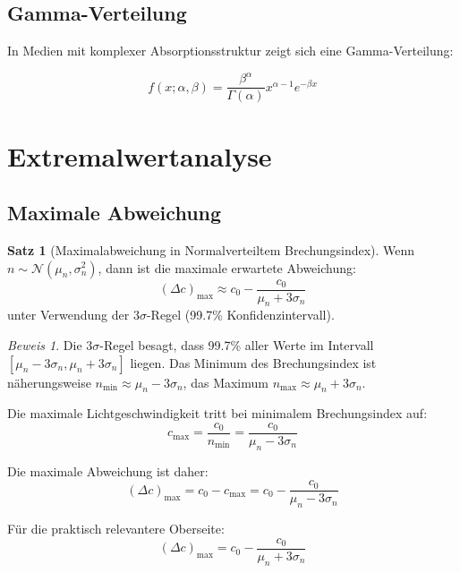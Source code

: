 \documentclass[a4paper,12pt]{article}
\theoremstyle{definition}
\newtheorem{satz}{Satz}[section]
\theoremstyle{remark}
\newtheorem*{beweis}{Beweis}
\newcommand{\cLight}{c}
\newcommand{\refIndex}{n}
\newcommand{\deviation}{\Delta}
\begin{document}
\subsection{Gamma-Verteilung}

In Medien mit komplexer Absorptionsstruktur zeigt sich eine Gamma-Verteilung:

\begin{equation}
    f(x; \alpha, \beta) = \frac{\beta^\alpha}{\Gamma(\alpha)} x^{\alpha-1} e^{-\beta x}
\end{equation}

\section{Extremalwertanalyse}

\subsection{Maximale Abweichung}

\begin{satz}[Maximalabweichung in Normalverteiltem Brechungsindex]
Wenn $\refIndex \sim \mathcal{N}(\mu_n, \sigma_n^2)$, dann ist die maximale erwartete Abweichung:
\begin{equation}
    (\deviation \cLight)_{\max} \approx \cLight_0 - \frac{\cLight_0}{\mu_n + 3\sigma_n}
\end{equation}
unter Verwendung der $3\sigma$-Regel (99.7\% Konfidenzintervall).
\end{satz}

\begin{beweis}
Die $3\sigma$-Regel besagt, dass 99.7\% aller Werte im Intervall $[\mu_n - 3\sigma_n, \mu_n + 3\sigma_n]$ liegen. Das Minimum des Brechungsindex ist näherungsweise $n_{\min} \approx \mu_n - 3\sigma_n$, das Maximum $n_{\max} \approx \mu_n + 3\sigma_n$.

Die maximale Lichtgeschwindigkeit tritt bei minimalem Brechungsindex auf:
\begin{equation}
    \cLight_{\max} = \frac{\cLight_0}{n_{\min}} = \frac{\cLight_0}{\mu_n - 3\sigma_n}
\end{equation}

Die maximale Abweichung ist daher:
\begin{equation}
    (\deviation \cLight)_{\max} = \cLight_0 - \cLight_{\max} = \cLight_0 - \frac{\cLight_0}{\mu_n - 3\sigma_n}
\end{equation}

Für die praktisch relevantere Oberseite:
\begin{equation}
    (\deviation \cLight)_{\max} = \cLight_0 - \frac{\cLight_0}{\mu_n + 3\sigma_n}
\end{equation}
\end{beweis}
\end{document}
